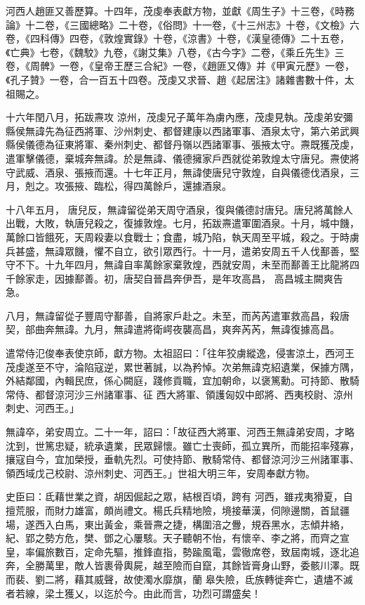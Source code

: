 \begin{pinyinscope}
 河西人趙匪又善歷算。十四年，茂虔奉表獻方物，並獻《周生子》十三卷，《時務論》十二卷，《三國總略》二十卷，《俗問》十一卷，《十三州志》十卷，《文檢》六卷，《四科傳》四卷，《敦煌實錄》十卷，《涼書》十卷，《漢皇德傳》二十五卷，《亡典》七卷，《魏駮》九卷，《謝艾集》八卷，《古今字》二卷，《乘丘先生》三卷，《周髀》一卷，《皇帝王歷三合紀》一卷，《趙匪又傳》并《甲寅元歷》一卷，《孔子贊》一卷，合一百五十四卷。茂虔又求晉、趙《起居注》諸雜書數十件，太祖賜之。



 十六年閏八月，拓跋燾攻
 涼州，茂虔兄子萬年為虜內應，茂虔見執。茂虔弟安彌縣侯無諱先為征西將軍、沙州刺史、都督建康以西諸軍事、酒泉太守，第六弟武興縣侯儀德為征東將軍、秦州刺史、都督丹嶺以西諸軍事、張掖太守。燾既獲茂虔，遣軍擊儀德，棄城奔無諱。於是無諱、儀德擁家戶西就從弟敦煌太守唐兒。燾使將守武威、酒泉、張掖而還。十七年正月，無諱使唐兒守敦煌，自與儀德伐酒泉，三月，剋之。攻張掖、臨松，得四萬餘戶，還據酒泉。



 十八年五月，
 唐兒反，無諱留從弟天周守酒泉，復與儀德討唐兒。唐兒將萬餘人出戰，大敗，執唐兒殺之，復據敦煌。七月，拓跋燾遣軍圍酒泉。十月，城中饑，萬餘口皆餓死，天周殺妻以食戰士；食盡，城乃陷，執天周至平城，殺之。于時虜兵甚盛，無諱眾饑，懼不自立，欲引眾西行。十一月，遣弟安周五千人伐鄯善，堅守不下。十九年四月，無諱自率萬餘家棄敦煌，西就安周，未至而鄯善王比龍將四千餘家走，因據鄯善。初，唐契自晉昌奔伊吾，是年攻高昌，
 高昌城主闕爽告急。



 八月，無諱留從子豐周守鄯善，自將家戶赴之。未至，而芮芮遣軍救高昌，殺唐契，部曲奔無諱。九月，無諱遣將衛崿夜襲高昌，爽奔芮芮，無諱復據高昌。



 遣常侍氾俊奉表使京師，獻方物。太祖詔曰：「往年狡虜縱逸，侵害涼土，西河王茂虔遂至不守，淪陷寇逆，累世著誠，以為矜悼。次弟無諱克紹遺業，保據方隅，外結鄰國，內輯民庶，係心闕庭，踐修貢職，宜加朝命，以褒篤勳。可持節、散騎常侍、都督涼河沙三州諸軍事、征
 西大將軍、領護匈奴中郎將、西夷校尉、涼州刺史、河西王。」



 無諱卒，弟安周立。二十一年，詔曰：「故征西大將軍、河西王無諱弟安周，才略沈到，世篤忠疑，統承遺業，民眾歸懷。雖亡士喪師，孤立異所，而能招率殘寡，攘寇自今，宜加榮授，垂軌先烈。可使持節、散騎常侍、都督涼河沙三州諸軍事、領西域戊己校尉、涼州刺史、河西王。」世祖大明三年，安周奉獻方物。



 史臣曰：氐藉世業之資，胡因倔起之眾，結根百頃，跨有
 河西，雖戎夷猾夏，自擅荒服，而財力雄富，頗尚禮文。楊氏兵精地險，境接華漢，伺隙邊關，首鼠疆場，遂西入白馬，東出黃金，乘晉燾之捷，構圍涪之釁，規吞黑水，志傾井絡，紀、郢之勢方危，樊、鄧之心屢駭。天子聽朝不怡，有懷辛、李之將，而齊之宣皇，率偏旅數百，定命先驅，推鋒直指，勢踰風電，雲徹席卷，致屆南城，逐北追奔，全勝萬里，敵人皆裹骨輿屍，越至險而自竄，其餘皆膏身山野，委骸川澤。既而裴、劉二將，藉其威聲，故使濁水靡旗，蘭
 皋失險，氐族轉徙奔亡，遺燼不滅者若線，梁土獲乂，以迄於今。由此而言，功烈可謂盛矣！



\end{pinyinscope}